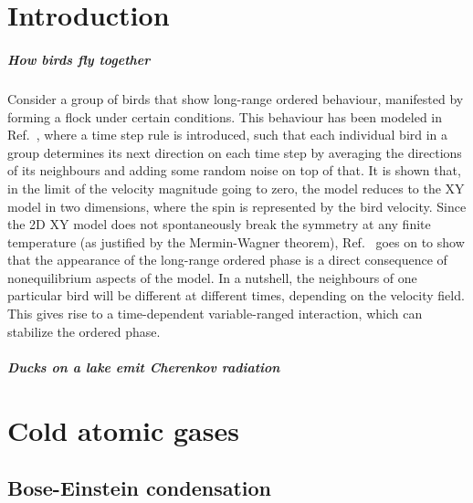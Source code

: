 \chapter{Introduction}



\paragraph{How birds fly together}%
Consider a group of birds that show long-range ordered behaviour,
manifested by forming a flock under certain conditions. This behaviour
has been modeled in Ref.~\cite{Toner1995}, where a time step rule is
introduced, such that each individual bird in a group determines its
next direction on each time step by averaging the directions of its
neighbours and adding some random noise on top of that. It is shown
that, in the limit of the velocity magnitude going to zero, the model
reduces to the XY model in two dimensions, where the spin is
represented by the bird velocity. Since the 2D XY model does not
spontaneously break the symmetry at any finite temperature (as
justified by the Mermin-Wagner theorem), Ref.~\cite{Toner1995} goes on
to show that the appearance of the long-range ordered phase is a
direct consequence of nonequilibrium aspects of the model. In a
nutshell, the neighbours of one particular bird will be different at
different times, depending on the velocity field. This gives rise to a
time-dependent variable-ranged interaction, which can stabilize the
ordered phase.

\paragraph{Ducks on a lake emit Cherenkov radiation}%

\chapter{Cold atomic gases}
\label{cha:cold-gases}

\section{Bose-Einstein condensation}
\label{sec:BEC}


